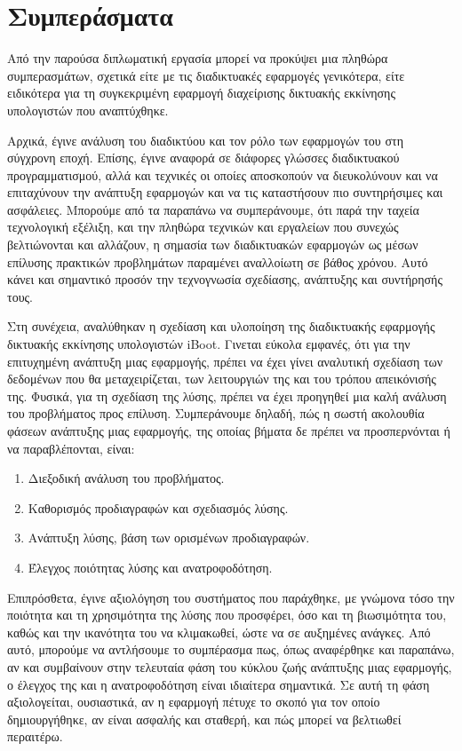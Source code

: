 \section{Συμπεράσματα}
Από την παρούσα διπλωματική εργασία μπορεί να προκύψει μια πληθώρα συμπερασμάτων, σχετικά είτε με τις διαδικτυακές εφαρμογές γενικότερα, είτε ειδικότερα για τη συγκεκριμένη εφαρμογή διαχείρισης δικτυακής εκκίνησης υπολογιστών που αναπτύχθηκε.

Αρχικά, έγινε ανάλυση του διαδικτύου και τον ρόλο των εφαρμογών του στη σύγχρονη εποχή. Επίσης, έγινε αναφορά σε διάφορες γλώσσες διαδικτυακού προγραμματισμού, αλλά και τεχνικές οι οποίες αποσκοπούν να διευκολύνουν και να επιταχύνουν την ανάπτυξη εφαρμογών και να τις καταστήσουν πιο συντηρήσιμες και ασφάλειες. Μπορούμε από τα παραπάνω να συμπεράνουμε, ότι παρά την ταχεία τεχνολογική εξέλιξη, και την πληθώρα τεχνικών και εργαλείων που συνεχώς βελτιώνονται και αλλάζουν, η σημασία των διαδικτυακών εφαρμογών ως μέσων επίλυσης πρακτικών προβλημάτων παραμένει αναλλοίωτη σε βάθος χρόνου. Αυτό κάνει και σημαντικό προσόν την τεχνογνωσία σχεδίασης, ανάπτυξης και συντήρησής τους.

Στη συνέχεια, αναλύθηκαν η σχεδίαση και υλοποίηση της διαδικτυακής εφαρμογής δικτυακής εκκίνησης υπολογιστών iBoot. Γινεται εύκολα εμφανές, ότι για την επιτυχημένη ανάπτυξη μιας εφαρμογής, πρέπει να έχει γίνει αναλυτική σχεδίαση των δεδομένων που θα μεταχειρίζεται, των λειτουργιών της και του τρόπου απεικόνισής της. Φυσικά, για τη σχεδίαση της λύσης, πρέπει να έχει προηγηθεί μια καλή ανάλυση του προβλήματος προς επίλυση. Συμπεράνουμε δηλαδή, πώς η σωστή ακολουθία φάσεων ανάπτυξης μιας εφαρμογής, της οποίας βήματα δε πρέπει να προσπερνόνται ή να παραβλέπονται, είναι:
\begin{enumerate}
	\item Διεξοδική ανάλυση του προβλήματος.
	\item Καθορισμός προδιαγραφών και σχεδιασμός λύσης.
	\item Ανάπτυξη λύσης, βάση των ορισμένων προδιαγραφών.
	\item Έλεγχος ποιότητας λύσης και ανατροφοδότηση.
\end{enumerate}

Επιπρόσθετα, έγινε αξιολόγηση του συστήματος που παράχθηκε, με γνώμονα τόσο την ποιότητα και τη χρησιμότητα της λύσης που προσφέρει, όσο και τη βιωσιμότητα του, καθώς και την ικανότητα του να κλιμακωθεί, ώστε να σε αυξημένες ανάγκες. Από αυτό, μπορούμε να αντλήσουμε το συμπέρασμα πως, όπως αναφέρθηκε και παραπάνω, αν και συμβαίνουν στην τελευταία φάση του κύκλου ζωής ανάπτυξης μιας εφαρμογής, ο έλεγχος της και η ανατροφοδότηση είναι ιδιαίτερα σημαντικά. Σε αυτή τη φάση αξιολογείται, ουσιαστικά, αν η εφαρμογή πέτυχε το σκοπό για τον οποίο δημιουργήθηκε, αν είναι ασφαλής και σταθερή, και πώς μπορεί να βελτιωθεί περαιτέρω.


